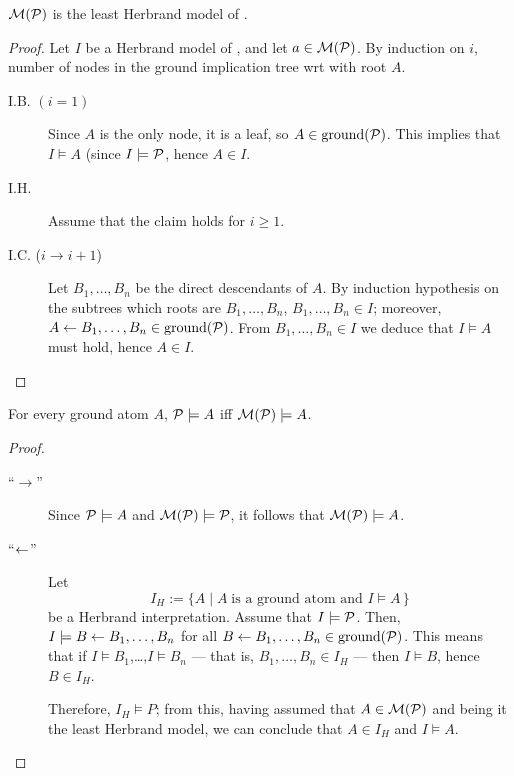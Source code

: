\begin{thm}
    \(\mathcal{M}(\mathcal{P})\) is the least Herbrand model of \prog.    
\end{thm}
\begin{proof}
    Let \(I\) be a Herbrand model of \prog, and let \(a \in \mathcal{M}(\mathcal{P})\).
    By induction on \(i\), number of nodes in the ground implication tree wrt \prog with root \(A\).
    \begin{description}
        \item[I.B. \((i = 1)\)] Since \(A\) is the only node, it is a leaf, so \(A \in \operatorname{ground}(\mathcal{P})\).
        This implies that \(I \models A\) (since \(I \models \mathcal{P}\), hence \(A \in I\).
        \item[I.H.] Assume that the claim holds for \(i \ge 1\).
        \item[I.C. (\(i \to i+1\))]
        Let \(B_1,\dotsc,B_n\) be the direct descendants of \(A\).
        By induction hypothesis on the subtrees which roots are \(B_1,\dotsc,B_n\), \(B_1,\dotsc,B_n \in I\); moreover, \(A \leftarrow B_1,\dotsc,B_n \in \operatorname{ground}(\mathcal{P})\).
        From \(B_1,\dotsc,B_n \in I\) we deduce that \(I \models A\) must hold, hence \(A \in I\).
    \end{description}
\end{proof}

\begin{thm}
    For every ground atom \(A\), \(\mathcal{P} \models A\) iff \(\mathcal{M}(\mathcal{P}) \models A\).
\end{thm}
\begin{proof}
    \begin{description}
        \item[``\(\to\)''] Since \(\mathcal{P} \models A\) and \(\mathcal{M}(\mathcal{P}) \models \mathcal{P}\), it follows that \(\mathcal{M}(\mathcal{P}) \models A\).
        \item[``\(\leftarrow\)''] Let
        \begin{equation*}
            I_H := \lbrace A \mid A\;\text{is a ground atom and \(I \models A\)}\,\rbrace
        \end{equation*}
        be a Herbrand interpretation.
        Assume that \(I \models \mathcal{P}\).
        Then, \(I \models B \leftarrow B_1,\dotsc,B_n\) for all \(B \leftarrow B_1,\dotsc,B_n \in \operatorname{ground}(\mathcal{P})\).
        This means that if \(I \models B_1\),\ldots,\(I \models B_n\) --- that is, \(B_1,\dotsc,B_n \in I_H\) --- then \(I \models B\), hence \(B \in I_H\).

        Therefore, \(I_H \models P\); from this, having assumed that \(A \in \mathcal{M}(\mathcal{P})\) and being it the least Herbrand model, we can conclude that \(A \in I_H\) and \(I \models A\).
    \end{description}
\end{proof}

